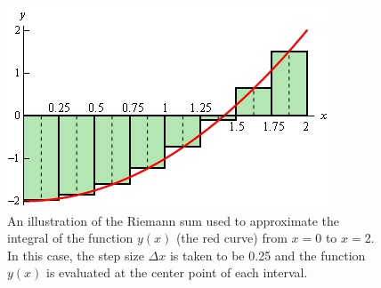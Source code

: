 \documentclass[12pt]{article}
\begin{document}
\begin{figure}[h!]
  \center
  \includegraphics[width=0.5\linewidth]{riemann}
  \caption{An illustration of the Riemann sum used to approximate the integral of the function $y(x)$ (the red curve) from $x=$0 to $x=$2.  In this case, the step size $\Delta x$ is taken to be 0.25 and the function $y(x)$ is evaluated at the center point of each interval.}
  \label{fig:riemann}
\end{figure}
\end{document}
